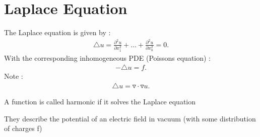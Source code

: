 \chapter{Laplace Equation}
The Laplace equation is given by : 
\begin{align*}
  \triangle u = \frac{\partial ^2 u}{\partial x_1^2} + \ldots  + \frac{\partial ^2 u}{\partial x_n^2}  = 0
.\end{align*}
With the corresponding inhomogeneous PDE (Poissons equation) : 
\begin{align*}
  - \triangle u = f
.\end{align*}
Note :
\begin{align*}
  \triangle u = \triangledown \cdot \triangledown u  
.\end{align*}
\begin{definition}
  A function is called harmonic if it solves the Laplace equation 
\end{definition}
They describe the potential of an electric field in vacuum (with some distribution of charges f)
